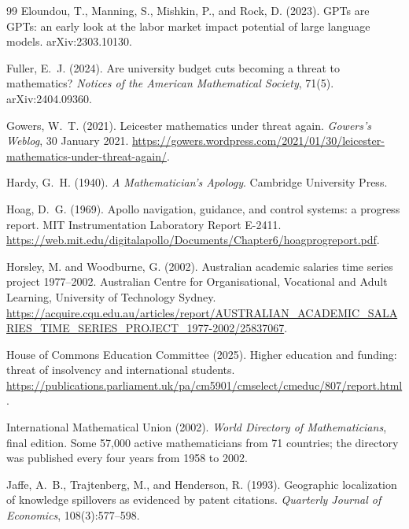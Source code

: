 \documentclass[11pt]{article}
\theoremstyle{definition}
\theoremstyle{remark}
\begin{document}
\begin{thebibliography}{99}
Eloundou, T., Manning, S., Mishkin, P., and Rock, D. (2023).
\newblock GPTs are GPTs: an early look at the labor market impact potential of large language models.
\newblock arXiv:2303.10130.

Fuller, E.~J. (2024).
\newblock Are university budget cuts becoming a threat to mathematics?
\newblock \emph{Notices of the American Mathematical Society}, 71(5). arXiv:2404.09360.

Gowers, W.~T. (2021).
\newblock Leicester mathematics under threat again.
\newblock \emph{Gowers's Weblog}, 30 January 2021. \url{https://gowers.wordpress.com/2021/01/30/leicester-mathematics-under-threat-again/}.

Hardy, G.~H. (1940).
\newblock \emph{A Mathematician's Apology}.
\newblock Cambridge University Press.

Hoag, D.~G. (1969).
\newblock Apollo navigation, guidance, and control systems: a progress report.
\newblock MIT Instrumentation Laboratory Report E-2411. \url{https://web.mit.edu/digitalapollo/Documents/Chapter6/hoagprogreport.pdf}.

Horsley, M. and Woodburne, G. (2002).
\newblock Australian academic salaries time series project 1977--2002.
\newblock Australian Centre for Organisational, Vocational and Adult Learning, University of Technology Sydney. \url{https://acquire.cqu.edu.au/articles/report/AUSTRALIAN_ACADEMIC_SALARIES_TIME_SERIES_PROJECT_1977-2002/25837067}.

House of Commons Education Committee (2025).
\newblock Higher education and funding: threat of insolvency and international students.
\newblock \url{https://publications.parliament.uk/pa/cm5901/cmselect/cmeduc/807/report.html}.

International Mathematical Union (2002).
\newblock \emph{World Directory of Mathematicians}, final edition.
\newblock Some 57{,}000 active mathematicians from 71 countries; the directory was published every four years from 1958 to 2002.

Jaffe, A.~B., Trajtenberg, M., and Henderson, R. (1993).
\newblock Geographic localization of knowledge spillovers as evidenced by patent citations.
\newblock \emph{Quarterly Journal of Economics}, 108(3):577--598.


\end{thebibliography}
\end{document}
